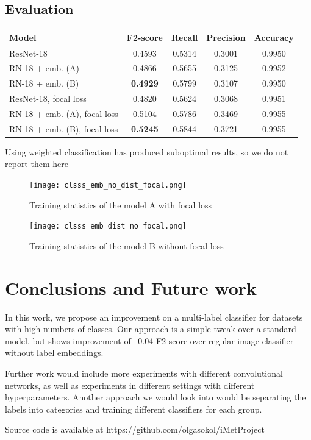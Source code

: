 \documentclass[10pt,twocolumn,letterpaper]{article}
\begin{document}
\subsection{Evaluation}
    \begin{minipage}[b]{0.5\hsize}\centering
    	\begin{tabular}{|m{1cm}|cccc|}
		\hline
		\textbf{Model} & \textbf{F2-score} & \textbf{Recall}  & \textbf{Precision} & \textbf{Accuracy} \\ \hline \hline
		ResNet-18 & 0.4593 & 0.5314& 0.3001 & 0.9950\\ \hline
		RN-18 + emb. (A) &0.4866 & 0.5655 & 0.3125 &0.9952\\ \hline
		RN-18 + emb. (B) &\textbf{0.4929} & 0.5799 & 0.3107 &0.9950\\ \hline  \hline
		ResNet-18, focal loss & 0.4820 & 0.5624& 0.3068& 0.9951\\ \hline
		RN-18 + emb. (A), focal loss  & 0.5104 & 0.5786& 0.3469 & 0.9955\\ \hline
		RN-18 + emb. (B), focal loss & \textbf{0.5245} & 0.5844&0.3721 & 0.9955\\ \hline
	\end{tabular}
	\label{tab:singlebest}
\end{minipage}
\par Using weighted classification has produced suboptimal results, so we do not report them here
\begin{figure}
	\texttt{[image: clsss\_emb\_no\_dist\_focal.png]}
	\centering
	\caption{Training statistics of the model A with focal loss}\label{fig:stat1}
\end{figure}
\begin{figure}
	\texttt{[image: clsss\_emb\_dist\_no\_focal.png]}
	\centering
	\caption{Training statistics of the model B without focal loss}\label{fig:stat2}
\end{figure}

\section{Conclusions and Future work}
In this work, we propose an improvement on a multi-label classifier for datasets with high numbers of classes. Our approach is a simple tweak over a standard model, but shows improvement of ~0.04 F2-score over regular image classifier without label embeddings.
\par
Further work would include more experiments with different convolutional networks, as well as experiments in different settings with different hyperparameters. Another approach we would look into would be separating the labels into categories and training different classifiers for each group.\par
Source code is available at https://github.com/olgasokol/iMetProject
\FloatBarrier
\end{document}
